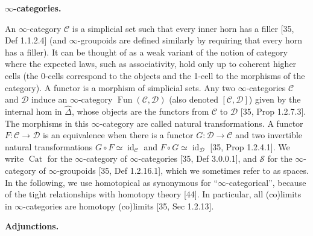 \documentclass[10pt,a4paper]{article}
\begin{document}
 
\par\medskip\noindent\textbf{$\infty$-categories.}\par
 
 
An $\infty$-category $\mathcal{C}$ is a simplicial set such that every inner horn has a filler [35, Def 1.1.2.4] (and $\infty$-groupoids are defined similarly by requiring that every horn has a filler). It can be thought of as a weak variant of the notion of category where the expected laws, such as associativity, hold only up to coherent higher cells (the 0-cells correspond to the objects and the 1-cell to the morphisms of the category). A functor is a morphism of simplicial sets. Any two $\infty$-categories $\mathcal{C}$ and $\mathcal{D}$ induce an $\infty$-category $\operatorname{Fun}(\mathcal{C},\mathcal{D})$ (also denoted $[\mathcal{C},\mathcal{D}]$) given by the internal hom in $\widehat{\Delta}$, whose objects are the functors from $\mathcal{C}$ to $\mathcal{D}$ [35, Prop 1.2.7.3]. The morphisms in this $\infty$-category are called natural transformations. A functor $F:\mathcal{C}\to\mathcal{D}$ is an equivalence when there is a functor $G:\mathcal{D}\to\mathcal{C}$ and two invertible natural transformations $G\circ F\simeq\operatorname{id}_{\mathcal{C}}$ and $F\circ G\simeq\operatorname{id}_{\mathcal{D}}$ [35, Prop 1.2.4.1]. We write $\operatorname{Cat}$ for the $\infty$-category of $\infty$-categories [35, Def 3.0.0.1], and $\mathcal{S}$ for the $\infty$-category of $\infty$-groupoids [35, Def 1.2.16.1], which we sometimes refer to as spaces. In the following, we use homotopical as synonymous for “$\infty$-categorical”, because of the tight relationships with homotopy theory [44]. In particular, all (co)limits in $\infty$-categories are homotopy (co)limits [35, Sec 1.2.13].\par
 
 
 
 
\par\medskip\noindent\textbf{Adjunctions.}\par
 
 
\end{document}
